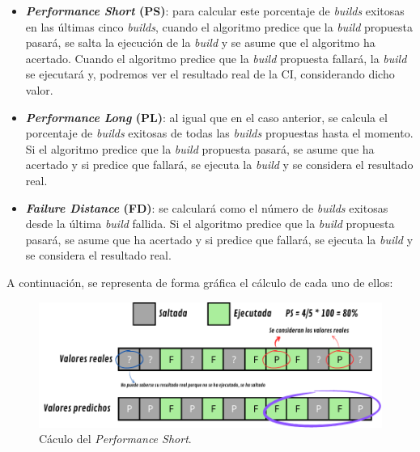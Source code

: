 \begin{itemize}
    \item \textbf{\textit{Performance Short} (PS)}: para calcular este porcentaje de \textit{builds}
    exitosas en las últimas cinco \textit{builds}, cuando el algoritmo predice que la \textit{build}
    propuesta pasará, se salta la ejecución de la \textit{build} y se asume que el algoritmo ha
    acertado. Cuando el algoritmo predice que la \textit{build} propuesta fallará, la \textit{build}
    se ejecutará y, podremos ver el resultado real de la CI, considerando dicho valor.\\

    \item \textbf{\textit{Performance Long} (PL)}: al igual que en el caso anterior, se calcula el
    porcentaje de \textit{builds} exitosas de todas las \textit{builds} propuestas hasta el momento.
    Si el algoritmo predice que la \textit{build} propuesta pasará, se asume que ha acertado y si
    predice que fallará, se ejecuta la \textit{build} y se considera el resultado real.\\

    \item \textbf{\textit{Failure Distance} (FD)}: se calculará como el número de \textit{builds}
    exitosas desde la última \textit{build} fallida. Si el algoritmo predice que la \textit{build}
    propuesta pasará, se asume que ha acertado y si predice que fallará, se ejecuta la
    \textit{build} y se considera el resultado real.\\

\end{itemize}

\noindent A continuación, se representa de forma gráfica el cálculo de cada uno de ellos:

\begin{figure}[H]
    \centering
    \includegraphics[scale=0.8]{images/PS.pdf}
    \caption{Cáculo del \textit{Performance Short}.}
    \label{fig:PS}
\end{figure}

